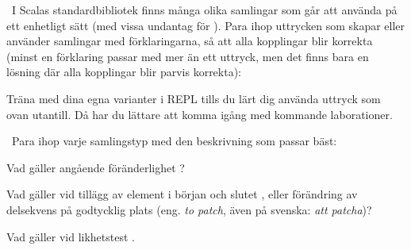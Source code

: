 \QUESTBEGIN

\Task \what~I Scalas standardbibliotek finns många olika samlingar som går att använda på ett enhetligt sätt (med vissa undantag för ). Para ihop uttrycken som skapar eller använder samlingar med förklaringarna, så att alla kopplingar blir korrekta (minst en förklaring passar med mer än ett uttryck, men det finns bara en lösning där alla kopplingar blir parvis korrekta):

\begin{ConceptConnections}

\end{ConceptConnections}

\noindent Träna med dina egna varianter i REPL tills du lärt dig använda uttryck som ovan utantill. Då har du lättare att komma igång med kommande laborationer.

\SOLUTION

\TaskSolved \what

\begin{ConceptConnections}

\end{ConceptConnections}

\QUESTEND






\QUESTBEGIN

\Task \what~Para ihop varje samlingstyp med den beskrivning som passar bäst:

\Subtask Vad gäller angående föränderlighet ?

\begin{ConceptConnections}

\end{ConceptConnections}

\Subtask Vad gäller vid tillägg av element i början  och slutet , eller förändring av delsekvens på godtycklig plats (eng. \emph{to patch}, även på svenska: \emph{att patcha})?

\begin{ConceptConnections}

\end{ConceptConnections}

\Subtask Vad gäller vid likhetstest .

